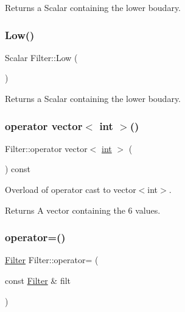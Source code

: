 Returns a Scalar containing the lower boudary. 

\mbox{\label{class_filter_a7b43f7cd0af1647ae9106af1ec159f63}} 
\subsubsection{\texorpdfstring{Low()}{Low()}}
{\footnotesize\ttfamily Scalar Filter\+::\+Low (\begin{DoxyParamCaption}{ }\end{DoxyParamCaption})\hspace{0.3cm}{\ttfamily [inline]}}



Returns a Scalar containing the lower boudary. 

\mbox{\label{class_filter_a147633122e621d3052b385237d8f7b6b}} 
\subsubsection{\texorpdfstring{operator vector$<$ int $>$()}{operator vector< int >()}}
{\footnotesize\ttfamily Filter\+::operator vector$<$ \mbox{\hyperlink{draw_8hh_aa620a13339ac3a1177c86edc549fda9b}{int}} $>$ (\begin{DoxyParamCaption}{ }\end{DoxyParamCaption}) const\hspace{0.3cm}{\ttfamily [inline]}}



Overload of operator cast to vector$<$int$>$. 

\begin{DoxyReturn}{Returns}
A vector containing the 6 values. 
\end{DoxyReturn}
\mbox{\label{class_filter_ad662158aa60a9a938d94fd45df5a6cd5}} 
\subsubsection{\texorpdfstring{operator=()}{operator=()}}
{\footnotesize\ttfamily \mbox{\hyperlink{class_filter}{Filter}} Filter\+::operator= (\begin{DoxyParamCaption}\item[{const \mbox{\hyperlink{class_filter}{Filter}} \&}]{filt }\end{DoxyParamCaption})\hspace{0.3cm}{\ttfamily [inline]}}




